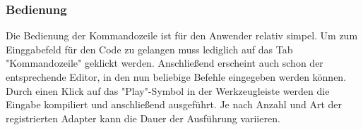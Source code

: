 \subsubsection{Bedienung}
Die Bedienung der Kommandozeile ist für den Anwender relativ simpel. Um zum Einggabefeld für den Code zu gelangen muss lediglich auf das Tab "Kommandozeile" geklickt werden. Anschließend erscheint auch schon der entsprechende Editor, in den nun beliebige Befehle eingegeben werden können. Durch einen Klick auf das "Play"-Symbol in der Werkzeugleiste werden die Eingabe kompiliert und anschließend ausgeführt. Je nach Anzahl und Art der registrierten Adapter kann die Dauer der Ausführung variieren.
